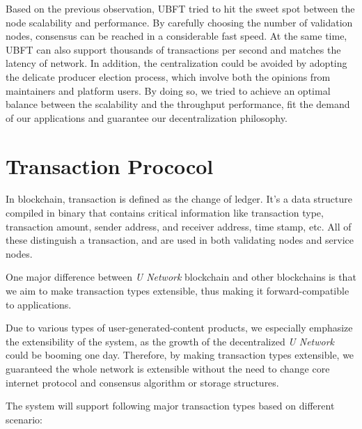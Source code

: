 Based on the previous observation, UBFT tried to hit the sweet spot between the node scalability and performance. By carefully choosing the number of validation nodes, consensus can be reached in a considerable fast speed. At the same time, UBFT can also support thousands of transactions per second and matches the latency of network. In addition, the centralization could be avoided by adopting the delicate producer election process, which involve both the opinions from maintainers and platform users. By doing so, we tried to achieve an optimal balance between the scalability and the throughput performance, fit the demand of our applications and guarantee our decentralization philosophy.



\section{Transaction Prococol}

	In blockchain, transaction is defined as the change of ledger. It's a data structure compiled in binary that contains critical information like transaction type, transaction amount, sender address, and receiver address, time stamp, etc. All of these distinguish a transaction, and are used in both validating nodes and service nodes.  

    One major difference between \emph{U Network} blockchain and other blockchains is that we aim to make transaction types extensible, thus making it forward-compatible to applications. 
	
	Due to various types of user-generated-content products, we especially emphasize the extensibility of the system, as the growth of the decentralized \emph{U Network} could be booming one day. Therefore, by making transaction types extensible, we guaranteed the whole network is extensible without the need to change core internet protocol and consensus algorithm or storage structures.
	
	The system will support following major transaction types based on different scenario: 
	
